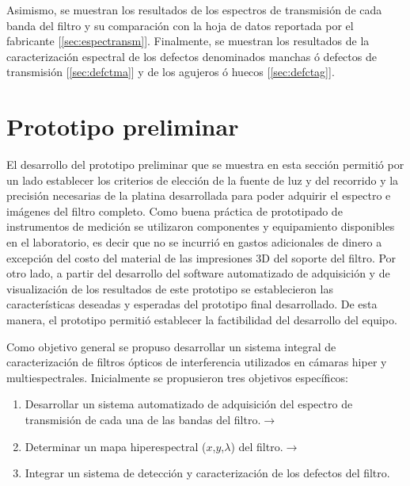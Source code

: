 Asimismo, se muestran los resultados de los espectros de transmisión de cada banda del filtro y su comparación con la hoja de datos reportada por el fabricante [\ref{sec:espectransm}]. Finalmente, se muestran los resultados de la caracterización espectral de los defectos denominados manchas ó defectos de transmisión [\ref{sec:defctma}] y de los agujeros ó huecos [\ref{sec:defctag}].


\singlespacing
\section{Prototipo preliminar\href{https://github.com/jrr1984/Prototipo0\_S-D\_SpectralGUI/blob/master/barrido/std/main.py}{\faGithub}}
\label{sec:prot0}

\hspace{0.5cm}El desarrollo del prototipo preliminar que se muestra en esta sección permitió por un lado establecer los criterios de elección de la fuente de luz y del recorrido y la precisión necesarias de la platina desarrollada para poder adquirir el espectro e imágenes del filtro completo. Como buena práctica de prototipado de instrumentos de medición se utilizaron componentes y equipamiento disponibles en el laboratorio, es decir que no se incurrió en gastos adicionales de dinero a excepción del costo del material de las impresiones 3D del soporte del filtro. Por otro lado, a partir del desarrollo del software automatizado de adquisición y de visualización de los resultados de este prototipo se establecieron las características deseadas y esperadas del prototipo final desarrollado. De esta manera, el prototipo permitió establecer la factibilidad del desarrollo del equipo.

Como objetivo general se propuso desarrollar un sistema integral de caracterización de filtros ópticos de interferencia utilizados en cámaras hiper y multiespectrales. Inicialmente se propusieron tres objetivos específicos:
\begin{enumerate}
\item Desarrollar un sistema automatizado de adquisición del espectro de transmisión de cada una de las bandas del filtro.$\xrightarrow{}$ \href{https://github.com/jrr1984/Prototipo0\_S-D\_SpectralGUI/blob/master/barrido/std}{\faGithub}

\item Determinar un mapa hiperespectral ($\textit{x}$,$\textit{y}$,$\lambda$) del filtro.$\xrightarrow{}$ \href{https://github.com/jrr1984/Prototipo0\_S-D\_SpectralGUI/blob/master/spectral\_gui/main.py}{\faGithub}

\item Integrar un sistema de detección y caracterización de los defectos del filtro.
\end{enumerate}

